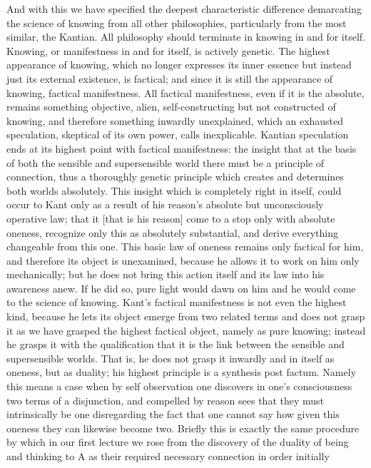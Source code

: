 \documentclass{article}
\begin{document}
And with this we have specified the deepest characteristic difference
demarcating the science of knowing from all other philosophies,
particularly from the most similar, the Kantian.
All philosophy should terminate in knowing in and for itself.
Knowing, or manifestness in and for itself, is actively genetic.
The highest appearance of knowing,
which no longer expresses its inner essence
but instead just its external existence, is factical;
and since it is still the appearance of knowing, factical manifestness.
All factical manifestness, even if it is the absolute, 
remains something objective, alien, self-constructing 
but not constructed of knowing,
and therefore something inwardly unexplained,
which an exhausted speculation, skeptical of its own power, calls inexplicable.
Kantian speculation ends at its highest point with factical manifestness:
the insight that at the basis of both the sensible and supersensible world
there must be a principle of connection, thus a thoroughly genetic principle
which creates and determines both worlds absolutely.
This insight which is completely right in itself, could occur to Kant
only as a result of his reason's absolute
but unconsciously operative law;
that it [that is his reason] come to a stop only with absolute oneness, 
recognize only this as absolutely substantial,
and derive everything changeable from this one.
This basic law of oneness remains only factical for him,
and therefore its object is unexamined,
because he allows it to work on him only mechanically;
but he does not bring this action itself 
and its law into his awareness anew.
If he did so, pure light would dawn on him 
and he would come to the science of knowing.
Kant's factical manifestness is not even the highest kind,
because he lets its object emerge from two related terms
and does not grasp it as we have grasped the highest factical object,
namely as pure knowing;
instead he grasps it with the qualification 
that it is the link between the sensible and supersensible worlds.
That is, he does not grasp it inwardly and in itself as oneness, but as duality;
his highest principle is a synthesis post factum.
Namely this means a case when by self observation 
one discovers in one's consciousness two terms of a disjunction,
and compelled by reason sees that they must intrinsically 
be one disregarding the fact that one cannot say how given this oneness
they can likewise become two.
Briefly this is exactly the same procedure by which in our first lecture 
we rose from the discovery of the duality of being and thinking
to A as their required necessary connection in order initially 
\end{document}
